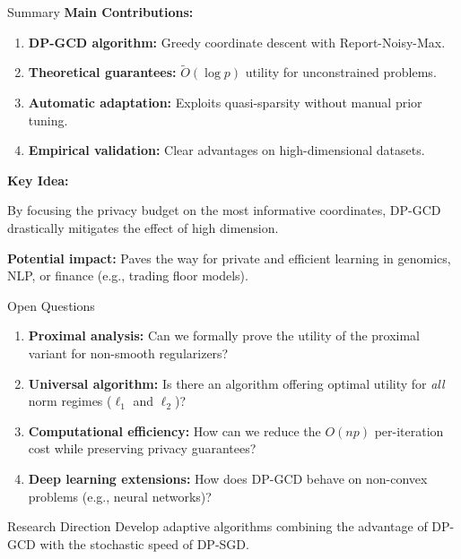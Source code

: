 \documentclass[10pt]{beamer}
\begin{document}
\begin{frame}{Summary}
\textbf{Main Contributions:}
\begin{enumerate}
\item \textbf{DP-GCD algorithm:} Greedy coordinate descent with Report-Noisy-Max.
\item \textbf{Theoretical guarantees:} $\tilde{O}(\log p)$ utility for unconstrained problems.
\item \textbf{Automatic adaptation:} Exploits quasi-sparsity without manual prior tuning.
\item \textbf{Empirical validation:} Clear advantages on high-dimensional datasets.
\end{enumerate}

\vspace{1em}
\textbf{Key Idea:}
\begin{block}{}
By focusing the privacy budget on the \alert{most informative} coordinates, DP-GCD drastically mitigates the effect of high dimension.
\end{block}

\vspace{1em}
\textbf{Potential impact:} Paves the way for private and efficient learning in genomics, NLP, or finance (e.g., trading floor models).
\end{frame}

\begin{frame}{Open Questions}
\begin{enumerate}
\item \textbf{Proximal analysis:} Can we formally prove the utility of the proximal variant for non-smooth regularizers?

\item \textbf{Universal algorithm:} Is there an algorithm offering optimal utility for \emph{all} norm regimes ($\ell_1$ and $\ell_2$)?

\item \textbf{Computational efficiency:} How can we reduce the $O(np)$ per-iteration cost while preserving privacy guarantees?

\item \textbf{Deep learning extensions:} How does DP-GCD behave on non-convex problems (e.g., neural networks)?
\end{enumerate}

\vspace{1em}
\begin{alertblock}{Research Direction}
Develop adaptive algorithms combining the advantage of DP-GCD with the stochastic speed of DP-SGD.
\end{alertblock}
\end{frame}
\end{document}
